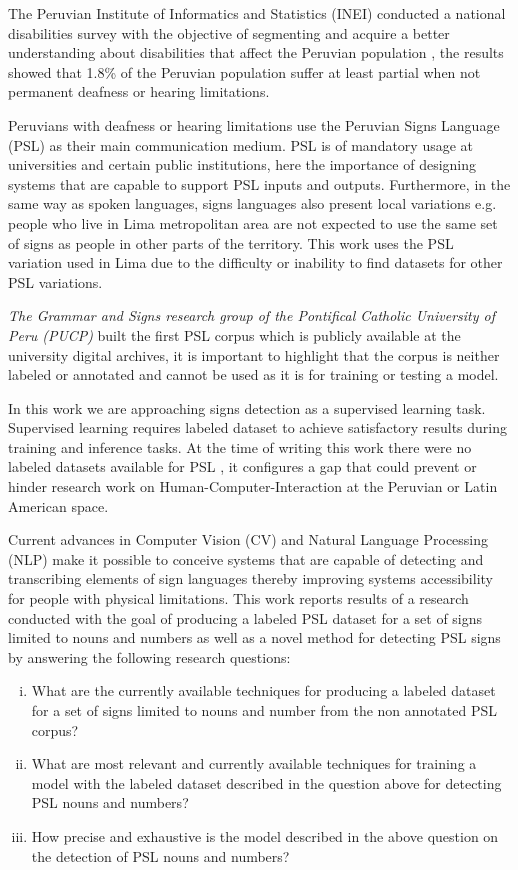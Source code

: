 \documentclass[twocolumn,conference]{article}
\begin{document}
The Peruvian Institute of Informatics and Statistics (INEI) conducted a national disabilities survey with the objective of segmenting and acquire a better understanding about disabilities that affect the Peruvian population \cite{disabilities_survey_2012}, the results showed that 1.8\% of the Peruvian population suffer at least partial when not permanent deafness or hearing limitations. 

Peruvians with deafness or hearing limitations use the Peruvian Signs Language (PSL) as their main communication medium. PSL is of mandatory usage at universities and certain public institutions, here the importance of designing systems that are capable to support PSL inputs and outputs. Furthermore, in the same way as spoken languages, signs languages also present local variations e.g. people who live in Lima metropolitan area are not expected to use the same set of signs as people in other parts of the territory. This work uses the PSL variation used in Lima due to the difficulty or inability to find datasets for other PSL variations. 

\textit{The Grammar and Signs research group of the Pontifical Catholic University of Peru (PUCP)} built the first PSL corpus \cite{lsp_dataset} which is publicly available at the university digital archives, it is important to highlight that the corpus is neither labeled or annotated and cannot be used as it is for training or testing a model.

In this work we are approaching signs detection as a supervised learning task. Supervised learning requires labeled dataset to achieve satisfactory results during training and inference tasks. At the time of writing this work there were no labeled datasets available for PSL \cite{lsp_2015}, it configures a gap that could prevent or hinder research work on Human-Computer-Interaction at the Peruvian or Latin American space.

Current advances in Computer Vision (CV) and Natural Language Processing (NLP) make it possible to conceive systems that are capable of detecting and transcribing elements of sign languages thereby improving systems accessibility for people with physical limitations. This work reports results of a research conducted with the goal of producing a labeled PSL dataset for a set of signs limited to nouns and numbers as well as a novel method for detecting PSL signs by answering the following research questions:

\begin{enumerate}[(i)]
\item What are the currently available techniques for producing a labeled dataset for a set of signs limited to nouns and number from the non annotated PSL corpus?\label{q1}
\item What are most relevant and currently available techniques for training a model with the labeled dataset described in the question above for detecting PSL nouns and numbers?\label{q2}
\item How precise and exhaustive is the model described in the above question on the detection of PSL nouns and numbers?\label{q3}
\end{enumerate}
\end{document}
